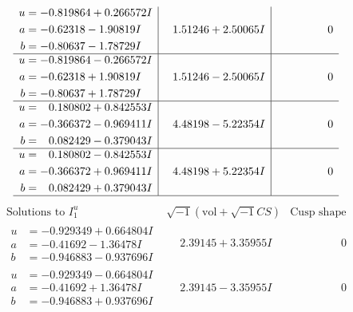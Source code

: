 \documentclass[1p]{elsarticle_modified}
\theoremstyle{definition}
\newcommand{\I}{\sqrt{-1}}
\begin{document}
$$\begin{array}{c|c|c}
\begin{aligned}
u &= -0.819864 + 0.266572 I \\
a &= -0.62318 - 1.90819 I \\
b &= -0.80637 - 1.78729 I\end{aligned}
 & \phantom{-}1.51246 + 2.50065 I & \phantom{-0.000000 } 0 \\ \hline\begin{aligned}
u &= -0.819864 - 0.266572 I \\
a &= -0.62318 + 1.90819 I \\
b &= -0.80637 + 1.78729 I\end{aligned}
 & \phantom{-}1.51246 - 2.50065 I & \phantom{-0.000000 } 0 \\ \hline\begin{aligned}
u &= \phantom{-}0.180802 + 0.842553 I \\
a &= -0.366372 - 0.969411 I \\
b &= \phantom{-}0.082429 - 0.379043 I\end{aligned}
 & \phantom{-}4.48198 - 5.22354 I & \phantom{-0.000000 } 0 \\ \hline\begin{aligned}
u &= \phantom{-}0.180802 - 0.842553 I \\
a &= -0.366372 + 0.969411 I \\
b &= \phantom{-}0.082429 + 0.379043 I\end{aligned}
 & \phantom{-}4.48198 + 5.22354 I & \phantom{-0.000000 } 0\\
 \hline 
 \end{array}$$\newpage$$\begin{array}{c|c|c}  
\text{Solutions to }I^u_{1}& \I (\text{vol} + \sqrt{-1}CS) & \text{Cusp shape}\\
 \hline 
\begin{aligned}
u &= -0.929349 + 0.664804 I \\
a &= -0.41692 - 1.36478 I \\
b &= -0.946883 - 0.937696 I\end{aligned}
 & \phantom{-}2.39145 + 3.35955 I & \phantom{-0.000000 } 0 \\ \hline\begin{aligned}
u &= -0.929349 - 0.664804 I \\
a &= -0.41692 + 1.36478 I \\
b &= -0.946883 + 0.937696 I\end{aligned}
 & \phantom{-}2.39145 - 3.35955 I & \phantom{-0.000000 } 0 \\ \hline\begin{aligned}

\end{aligned}
\end{array}$$
\end{document}
